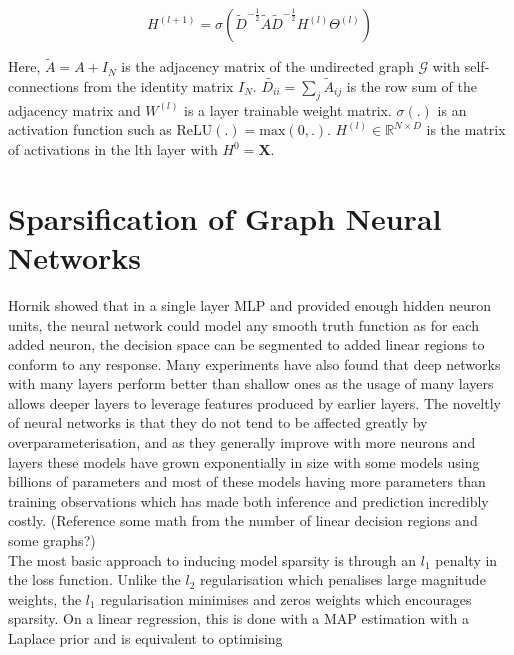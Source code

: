 \documentclass[honours,12pt]{unswthesis}
\numberwithin{equation}{section}
\begin{document}
\begin{equation}
    H^{(l+1)} = \sigma(\tilde{D}^{-\frac{1}{2}} \tilde{A} \tilde{D}^{-\frac{1}{2}} H^{(l)} \Theta^{(l)})
\end{equation}

\noindent Here, $\tilde{A} = A + I_N$ is the adjacency matrix of the undirected graph $\mathcal{G}$ with self-connections from the identity matrix $I_N$.
$\tilde{D_{ii}} = \sum_{j} \tilde{A}_{ij} $ is the row sum of the adjacency matrix and $W^{(l)}$ is a layer trainable weight matrix. 
$\sigma(.)$ is an activation function such as $\text{ReLU}(.) = \text{max}(0, .)$. $H^{(l)} \in \mathbb{R}^{N \times D}$ is the matrix of activations
in the lth layer with $H^0 = \textbf{X}$. 


\section{Sparsification of Graph Neural Networks}\label{sparse-learning}

Hornik\cite{HORNIK1991251} showed that in a single layer MLP and provided enough hidden neuron units, 
the neural network could model any smooth truth function as for each added neuron, 
the decision space can be segmented to added linear regions to conform to any response. 
Many experiments have also found that deep networks with many layers perform better than shallow ones\cite{NIPS2014_109d2dd3}\cite{pmlr-v70-raghu17a}
as the usage of many layers allows deeper layers to leverage features produced by earlier layers.
The noveltly of neural networks is that they do not tend to be affected greatly by overparameterisation\cite{Cao_Gu_2020}, and as they generally improve with more neurons
and layers these models have grown exponentially in size with some models using billions of parameters and most of these models having more parameters than training observations
which has made both inference and prediction incredibly costly.  (Reference some math from the number of linear decision regions and some graphs?) \\

{\noindent}The most basic approach to inducing model sparsity is through an $l_1$ penalty in the loss function.\cite{pml1Book}
Unlike the $l_2$ regularisation which penalises large magnitude weights, the $l_1$ regularisation minimises and zeros weights which encourages sparsity.
On a linear regression, this is done with a MAP estimation with a Laplace prior and is equivalent to optimising
\end{document}
